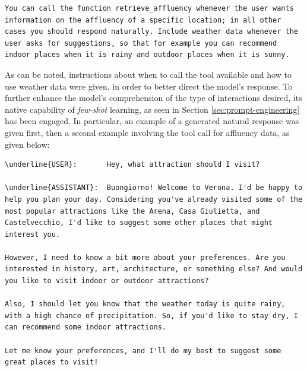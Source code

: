 \begin{Verbatim}[breaklines=true]
You can call the function retrieve_affluency whenever the user wants information on the affluency of a specific location; in all other cases you should respond naturally. Include weather data whenever the user asks for suggestions, so that for example you can recommend indoor places when it is rainy and outdoor places when it is sunny.
\end{Verbatim}

As can be noted, instructions about when to call the tool available and how to use weather data were given, in order to better direct the model's response. To further enhance the model's comprehension of the type of interactions desired, its native capability of \textit{few-shot} learning, as seen in Section \ref{sec:prompt-engineering} has been engaged. In particular, an example of a generated natural response was given first, then a second example involving the tool call for affluency data, as given below:

\begin{Verbatim}[breaklines=true]
\underline{USER}:       Hey, what attraction should I visit?

\underline{ASSISTANT}:  Buongiorno! Welcome to Verona. I'd be happy to help you plan your day. Considering you've already visited some of the most popular attractions like the Arena, Casa Giulietta, and Castelvecchio, I'd like to suggest some other places that might interest you.

However, I need to know a bit more about your preferences. Are you interested in history, art, architecture, or something else? And would you like to visit indoor or outdoor attractions?

Also, I should let you know that the weather today is quite rainy, with a high chance of precipitation. So, if you'd like to stay dry, I can recommend some indoor attractions.

Let me know your preferences, and I'll do my best to suggest some great places to visit!
\end{Verbatim}


